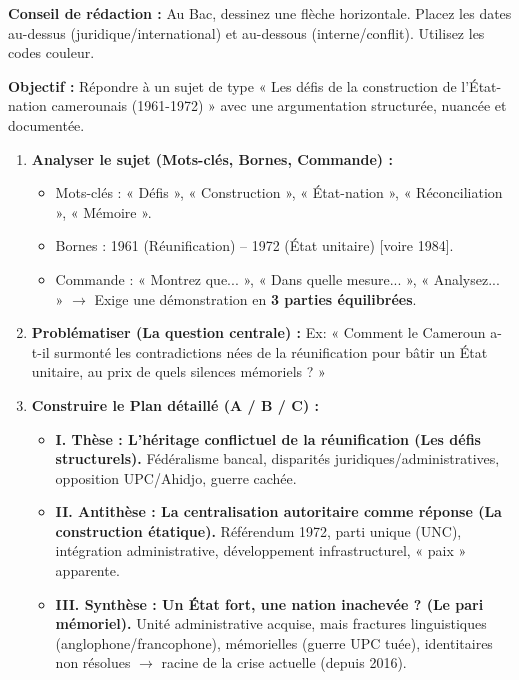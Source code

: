 \documentclass[11pt]{article}
\newcommand{\cle}[1]{{\popxbold\color{popdark}#1}}
\begin{document}
\begin{exoresolu}
\textbf{Conseil de rédaction :} Au Bac, dessinez une flèche horizontale. Placez les dates au-dessus (juridique/international) et au-dessous (interne/conflit). Utilisez les codes couleur.
\end{exoresolu}

\begin{methode}
\textbf{Objectif :} Répondre à un sujet de type « Les défis de la construction de l'État-nation camerounais (1961-1972) » avec une argumentation structurée, nuancée et documentée.
\begin{enumerate}
    \item \textbf{Analyser le sujet (Mots-clés, Bornes, Commande) :}
        \begin{itemize}
            \item \cle{Mots-clés} : « Défis », « Construction », « État-nation », « Réconciliation », « Mémoire ».
            \item \cle{Bornes} : 1961 (Réunification) -- 1972 (État unitaire) [voire 1984].
            \item \cle{Commande} : « Montrez que... », « Dans quelle mesure... », « Analysez... » $\rightarrow$ Exige une démonstration en \textbf{3 parties équilibrées}.
        \end{itemize}
    \item \textbf{Problématiser (La question centrale) :} Ex: « Comment le Cameroun a-t-il surmonté les contradictions nées de la réunification pour bâtir un État unitaire, au prix de quels silences mémoriels ? »
    \item \textbf{Construire le Plan détaillé (A / B / C) :}
        \begin{itemize}
            \item \textbf{I. Thèse : L'héritage conflictuel de la réunification (Les défis structurels).} Fédéralisme bancal, disparités juridiques/administratives, opposition UPC/Ahidjo, guerre cachée.
            \item \textbf{II. Antithèse : La centralisation autoritaire comme réponse (La construction étatique).} Référendum 1972, parti unique (UNC), intégration administrative, développement infrastructurel, « paix » apparente.
            \item \textbf{III. Synthèse : Un État fort, une nation inachevée ? (Le pari mémoriel).} Unité administrative acquise, mais fractures linguistiques (anglophone/francophone), mémorielles (guerre UPC tuée), identitaires non résolues $\rightarrow$ racine de la crise actuelle (depuis 2016).

\end{itemize}
\end{enumerate}
\end{methode}
\end{document}
